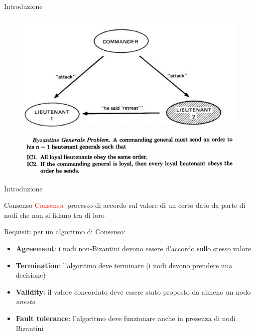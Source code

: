 \documentclass{beamer}
\newcommand\red[1]{\textcolor{red}{#1}}
\begin{document}
    \begin{frame}{Introduzione}
        \begin{figure}[!htb]
                \centering
                \includegraphics[width=0.5\linewidth]{../img/byzantine.jpg}
        \end{figure}
        \begin{figure}
            \centering
            \includegraphics[width=0.7\linewidth]{../img/byzantine-generals-problem.png}
        \end{figure}
    \end{frame}




  \begin{frame}{Introduzione}
    \begin{block}{Consenso}
      \red{Consenso}: processo di accordo sul valore di un certo dato da parte di nodi che non si fidano tra di loro
    \end{block}

    \pause
    Requisiti per un algoritmo di Consenso:
    \begin{itemize}
      \item \textbf{Agreement}: i nodi non-Bizantini devono essere d'accordo sullo stesso valore
      \item \textbf{Termination}: l'algoritmo deve terminare (i nodi devono prendere una decisione)
      \item \textbf{Validity}: il valore concordato deve essere stato proposto da almeno un nodo \emph{onesto}
      \item \textbf{Fault tolerance}: l'algoritmo deve funzionare anche in presenza di nodi Bizantini 
    \end{itemize}
  \end{frame}

  
  
  
\end{document}
